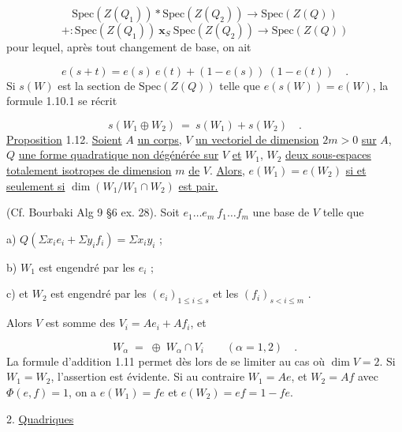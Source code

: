 \begin{equation}\tag{1.11.1}
\mathrm{Spec}(Z(Q_1)) * \mathrm{Spec}(Z(Q_2)) \longrightarrow \mathrm{Spec}(Z(Q))
\end{equation}
\begin{equation*}
+ : \mathrm{Spec}(Z(Q_1))\ \mathbf{x}_S\ \mathrm{Spec}(Z(Q_2)) \longrightarrow \mathrm{Spec}(Z(Q))
\end{equation*}
pour lequel, après tout changement de base, on ait

\begin{equation*}
e(s + t) = e(s)\ e(t) + (1 - e(s))\ (1 - e(t)) \quad .
\end{equation*}
Si $s(W)$ est la section de $\mathrm{Spec}(Z(Q))$ telle que $e(s(W)) = e(W)$, la formule 1.10.1 se récrit

\begin{equation*}
s(W_1 \oplus W_2)\ =\ s(W_1) + s(W_2) \quad .
\end{equation*}
\underline{Proposition} 1.12. \underline{Soient} $A$ \underline{un corps,} $V$ \underline{un vectoriel de dimension} $2m > 0$ \underline{sur} $A$, $Q$ \underline{une forme quadratique non dégénérée sur} $V$ \underline{et} $W_1$, $W_2$ \underline{deux sous-espaces totalement isotropes de dimension} $m$ \underline{de} $V$. \underline{Alors}, $e(W_1) = e(W_2)$ \underline{si et seulement si} $\dim(W_1/W_1 \cap W_2)$ \underline{est pair.}



(Cf. Bourbaki Alg 9 \S 6 ex. 28). Soit $e_1 \dots e_m\ f_1 \dots f_m$ une base de $V$ telle que

a) \qquad $Q( \Sigma x_i e_i + \Sigma y_i f_i) = \Sigma x_i y_i$ ;

b) \qquad $W_1$ est engendré par les $e_i$ ;

c) \qquad et $W_2$ est engendré par les $(e_i)_{1 \leqslant i \leqslant s}$ et les $(f_i)_{s < i \leqslant m}$ .

Alors $V$ est somme des $V_i = A e_i + A f_i$, et

\begin{equation*}
W_\alpha \;=\; \oplus \; W_\alpha \cap V_i \qquad (\alpha = 1,2) \quad .
\end{equation*}
La formule d'addition 1.11 permet dès lors de se limiter au cas où $\dim V = 2$. Si $W_1 = W_2$, l'assertion est évidente. Si au contraire $W_1 = Ae$, et $W_2 = Af$ avec $\Phi(e,f) = 1$, on a $e(W_1) = fe$ et $e(W_2) = ef = 1 - fe$.


2. \underline{Quadriques}

